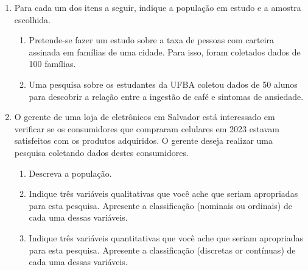 \documentclass{article}
\begin{document}
\begin{enumerate}

    \item Para cada um dos itens a seguir, indique a população em estudo e a amostra escolhida.
    \begin{enumerate}
    	\item Pretende-se fazer um estudo sobre a taxa de pessoas com carteira assinada em famílias de uma cidade. Para isso, foram coletados dados de 100 famílias.
    	\item Uma pesquisa sobre os estudantes da UFBA coletou dados de 50 alunos para descobrir a relação entre a ingestão de café e sintomas de ansiedade.
    \end{enumerate}
    
    
    	\item O gerente de uma loja de eletrônicos em Salvador está interessado em verificar se os consumidores que compraram celulares em 2023 estavam satisfeitos com os produtos adquiridos. O gerente deseja realizar uma pesquisa coletando dados destes consumidores.
	\begin{enumerate}
		\item Descreva a população.
		\item Indique três variáveis qualitativas que você ache que seriam apropriadas para esta pesquisa. Apresente a classificação (nominais ou ordinais) de cada uma dessas variáveis.
		\item Indique três variáveis quantitativas que você ache que seriam apropriadas para esta pesquisa. Apresente a classificação (discretas or contínuas) de cada uma dessas variáveis.
	\end{enumerate}
	

\end{enumerate}
\end{document}
